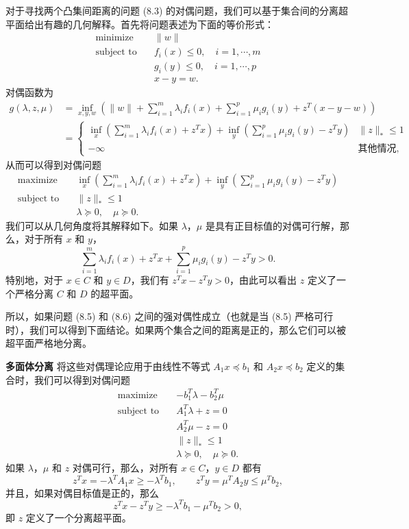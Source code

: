 \documentclass[UTF8,12pt,a4paper,fontset=fandol]{ctexart}
\begin{document}
对于寻找两个凸集间距离的问题 (8.3) 的对偶问题，我们可以基于集合间的分离超平面给出有趣的几何解释。首先将问题表述为下面的等价形式：
\begin{equation}
\begin{aligned}
\text{minimize}\quad & \|w\|\\
\text{subject to}\quad & f_i(x)\leq 0,\quad i=1,\cdots,m\\
& g_i(y)\leq 0,\quad i=1,\cdots,p\\
& x-y=w.
\end{aligned}
\tag{8.5}
\end{equation}
对偶函数为
\[
\begin{aligned}
g(\lambda,z,\mu)
&=\inf_{x,y,w}\left(\|w\|+\sum_{i=1}^m\lambda_i f_i(x)+\sum_{i=1}^p\mu_i g_i(y)+z^T(x-y-w)\right)\\
&=
\begin{cases}
\displaystyle\inf_x\left(\sum_{i=1}^m\lambda_i f_i(x)+z^Tx\right)
+\inf_y\left(\sum_{i=1}^p\mu_i g_i(y)-z^Ty\right) & \|z\|_\ast\leq 1\\
-\infty & \text{其他情况},
\end{cases}
\end{aligned}
\]
从而可以得到对偶问题
\begin{equation}
\begin{aligned}
\text{maximize}\quad & \displaystyle\inf_x\left(\sum_{i=1}^m\lambda_i f_i(x)+z^Tx\right)
+\inf_y\left(\sum_{i=1}^p\mu_i g_i(y)-z^Ty\right)\\
\text{subject to}\quad & \|z\|_\ast\leq 1\\
& \lambda\succeq 0,\quad \mu\succeq 0.
\end{aligned}
\tag{8.6}
\end{equation}
我们可以从几何角度将其解释如下。如果 $\lambda$，$\mu$ 是具有正目标值的对偶可行解，那么，对于所有 $x$ 和 $y$，
\[
\sum_{i=1}^m\lambda_i f_i(x)+z^Tx+\sum_{i=1}^p\mu_i g_i(y)-z^Ty>0.
\]
特别地，对于 $x\in C$ 和 $y\in D$，我们有 $z^Tx-z^Ty>0$，由此可以看出 $z$ 定义了一个严格分离 $C$ 和 $D$ 的超平面。

所以，如果问题 (8.5) 和 (8.6) 之间的强对偶性成立（也就是当 (8.5) 严格可行时），我们可以得到下面结论。如果两个集合之间的距离是正的，那么它们可以被超平面严格地分离。

\noindent\textbf{多面体分离}\quad
将这些对偶理论应用于由线性不等式 $A_1x\preceq b_1$ 和 $A_2x\preceq b_2$ 定义的集合时，我们可以得到对偶问题
\[
\begin{aligned}
\text{maximize}\quad & -b_1^T\lambda-b_2^T\mu\\
\text{subject to}\quad & A_1^T\lambda+z=0\\
& A_2^T\mu-z=0\\
& \|z\|_\ast\leq 1\\
& \lambda\succeq 0,\quad \mu\succeq 0.
\end{aligned}
\]
如果 $\lambda$，$\mu$ 和 $z$ 对偶可行，那么，对所有 $x\in C$，$y\in D$ 都有
\[
z^Tx=-\lambda^TA_1x\geq -\lambda^Tb_1,\qquad
z^Ty=\mu^TA_2y\leq \mu^Tb_2,
\]
并且，如果对偶目标值是正的，那么
\[
z^Tx-z^Ty\geq -\lambda^Tb_1-\mu^Tb_2>0,
\]
即 $z$ 定义了一个分离超平面。
\end{document}
